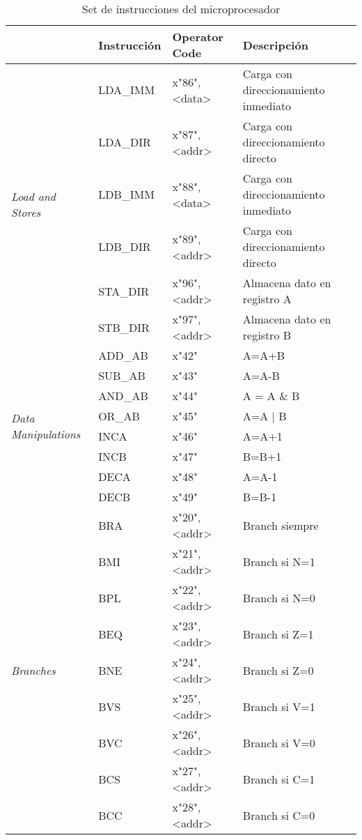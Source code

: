 \documentclass[a4paper,twoside]{article}
\begin{document}
\begin{table}[h!]
    \centering
    \begin{tabular}{|l|l|l|l|}
    \hline
     &\multicolumn{1}{c|}{Instrucción} & {Operator Code} & {Descripción} \\
     \hline \hline
    \multirow{6}{*}{\textit{Load and Stores}} & LDA\_IMM  & x"86",<data> & Carga con direccionamiento inmediato \\ \cline{2-4}
                            								  & LDA\_DIR  & x"87",<addr> & Carga con direccionamiento directo \\ \cline{2-4}
                            								  & LDB\_IMM  & x"88",<data> & Carga con direccionamiento inmediato \\ \cline{2-4}
                            								  & LDB\_DIR  & x"89",<addr> & Carga con direccionamiento directo \\ \cline{2-4}
																						  & STA\_DIR  & x"96",<addr> & Almacena dato en registro A \\ \cline{2-4}
																							& STB\_DIR  & x"97",<addr> & Almacena dato en registro B \\ \cline{2-4}
																							\hline
	\multirow{8}{*}{\textit{Data Manipulations}} & ADD\_AB  & x"42" & A=A+B \\ \cline{2-4}
	                         								     & SUB\_AB  & x"43" & A=A-B \\ \cline{2-4}
																					  & AND\_AB  & x"44" &  A = A \& B \\ \cline{2-4}
																					  & OR\_AB  & x"45" &  A=A | B \\ \cline{2-4}
																						& INCA  & x"46" &   A=A+1 \\ \cline{2-4}
																						& INCB  & x"47" &  B=B+1 \\ \cline{2-4}
																						& DECA  & x"48" &  A=A-1 \\ \cline{2-4}
																						& DECB  & x"49" &  B=B-1 \\ \cline{2-4}
																							\hline
 \multirow{9}{*}{\textit{Branches}}  & BRA  & x"20",<addr> & Branch siempre \\ \cline{2-4}
                          					 & BMI  & x"21",<addr> & Branch si N=1 \\ \cline{2-4}
																		 & BPL  & x"22",<addr> & Branch si N=0 \\ \cline{2-4}
																		 & BEQ  & x"23",<addr> & Branch si Z=1 \\ \cline{2-4}
																	   & BNE  & x"24",<addr> & Branch si Z=0 \\ \cline{2-4}
																		 & BVS  & x"25",<addr> & Branch si V=1 \\ \cline{2-4}
																		 & BVC  & x"26",<addr> & Branch si V=0 \\ \cline{2-4}
																		 & BCS  & x"27",<addr> & Branch si C=1 \\ \cline{2-4}
																	   & BCC  & x"28",<addr> & Branch si C=0 \\ \cline{2-4}
																		 	\hline
    \end{tabular}    \caption{Set de instrucciones del microprocesador}
    \end{table}
\end{document}
